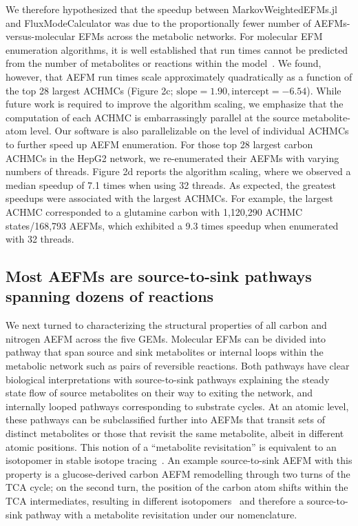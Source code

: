 \documentclass[12pt]{article}
\begin{document}
We therefore hypothesized that the speedup between MarkovWeightedEFMs.jl
and FluxModeCalculator was due to the proportionally fewer number of
AEFMs-versus-molecular EFMs across the metabolic networks. For molecular
EFM enumeration algorithms, it is well established that run times cannot
be predicted from the number of metabolites or reactions within the
model~\citep{UllahEhsan2020Tsef}. We found, however, that AEFM run times
scale approximately quadratically as a function of the top 28 largest
ACHMCs (Figure 2c; $\text{slope}=1.90, \text{intercept}=-6.54$). While
future work is required to improve the algorithm scaling, we emphasize
that the computation of each ACHMC is embarrassingly parallel at the
source metabolite-atom level. Our software is also parallelizable on the
level of individual ACHMCs to further speed up AEFM enumeration. For those
top 28 largest carbon ACHMCs in the HepG2 network, we re-enumerated their
AEFMs with varying numbers of threads. Figure 2d reports the algorithm
scaling, where we observed a median speedup of 7.1 times when using 32
threads. As expected, the greatest speedups were associated with the
largest ACHMCs. For example, the largest ACHMC corresponded to a glutamine
carbon with 1,120,290 ACHMC states/168,793 AEFMs, which exhibited a 9.3
times speedup when enumerated with 32 threads.

\fi

\subsection*{Most AEFMs are source-to-sink pathways spanning dozens of reactions}

We next turned to characterizing the structural properties of all carbon
and nitrogen AEFM across the five GEMs. Molecular EFMs can be divided into
pathway that span source and sink metabolites or internal loops within the
metabolic network such as pairs of reversible reactions. Both pathways
have clear biological interpretations with source-to-sink pathways
explaining the steady state flow of source metabolites on their way to
exiting the network, and internally looped pathways corresponding to
substrate cycles. At an atomic level, these pathways can be subclassified
further into AEFMs that transit sets of distinct metabolites or those that
revisit the same metabolite, albeit in different atomic positions. This
notion of a ``metabolite revisitation'' is equivalent to an isotopomer in
stable isotope tracing~\citep{AntoniewiczMaciekR2018Agt1}. An example
source-to-sink AEFM with this property is a glucose-derived carbon AEFM
remodelling through two turns of the TCA cycle; on the second turn, the
position of the carbon atom shifts within the TCA intermediates, resulting
in different isotopomers~\citep{DuanLikun20221tas} and therefore
a source-to-sink pathway with a metabolite revisitation under our
nomenclature.
\end{document}
